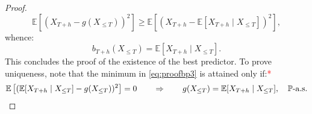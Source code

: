 \begin{proof}
\begin{equation}
    \mathbb{E}\left[(X_{T+h}-g(X_{\leq T}))^{2}\right]\geq\mathbb{E}\left[(X_{T+h}-\mathbb{E}[X_{T+h}\mid X_{\leq T}])^{2}\right],
\end{equation}
whence:
\begin{equation*}
    b_{T+h}(X_{\leq T})=\mathbb{E}[X_{T+h}\mid X_{\leq T}].
\end{equation*}
This concludes the proof of the existence of the best predictor. To prove uniqueness, note that the minimum in \eqref{eq:proofbp3} is attained only if:\textcolor{red}{*}
\begin{equation*}
    \mathbb{E}\left[(\mathbb{E}[X_{T+h}\mid X_{\leq T}]-g(X_{\leq T}))^{2}\right]=0\qquad\Rightarrow\qquad g(X_{\leq T})=\mathbb{E}[X_{T+h}\mid X_{\leq T}],\quad\textrm{$\mathbb{P}$-a.s.}\qedhere
\end{equation*}
\end{proof}



